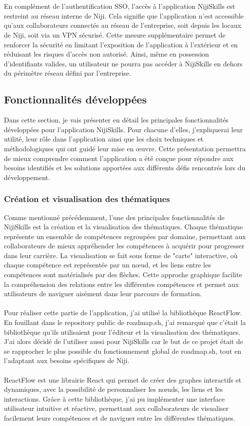 \documentclass[12pt]{article}
\begin{document}
\\\\
En complément de l’authentification SSO, l’accès à l’application NijiSkills est restreint au réseau interne de Niji. Cela signifie que l’application n’est accessible qu’aux collaborateurs connectés au réseau de l’entreprise, soit depuis les locaux de Niji, soit via un VPN sécurisé. Cette mesure supplémentaire permet de renforcer la sécurité en limitant l’exposition de l’application à l’extérieur et en réduisant les risques d’accès non autorisé. Ainsi, même en possession d’identifiants valides, un utilisateur ne pourra pas accéder à NijiSkills en dehors du périmètre réseau défini par l’entreprise.
\subsection{Fonctionnalités développées}
Dans cette section, je vais présenter en détail les principales fonctionnalités développées pour l’application NijiSkills. Pour chacune d’elles, j’expliquerai leur utilité, leur rôle dans l’application ainsi que les choix techniques et méthodologiques qui ont guidé leur mise en œuvre. Cette présentation permettra de mieux comprendre comment l’application a été conçue pour répondre aux besoins identifiés et les solutions apportées aux différents défis rencontrés lors du développement.
\subsubsection{Création et visualisation des thématiques}
Comme mentionné précédemment, l'une des principales fonctionnalités de NijiSkills est la création et la visualisation des thématiques. Chaque thématique représente un ensemble de compétences regroupées par domaine, permettant aux collaborateurs de mieux appréhender les compétences à acquérir pour progresser dans leur carrière. La visualisation se fait sous forme de "carte" interactive, où chaque compétence est représentée par un nœud, et les liens entre les compétences sont matérialisés par des flèches. Cette approche graphique facilite la compréhension des relations entre les différentes compétences et permet aux utilisateurs de naviguer aisément dans leur parcours de formation.
\\\\
Pour réaliser cette partie de l'application, j'ai utilisé la bibliothèque ReactFlow. En fouillant dans le repository public de roadmap.sh, j'ai remarqué que c'était la bibliothèque qu'ils utilisaient pour l'éditeur et la visualisation des thématiques. J'ai alors décidé de l'utiliser aussi pour NijiSkills car le but de ce projet était de se rapprocher le plus possible du fonctionnement global de roadmap.sh, tout en l'adaptant aux besoins spécifiques de Niji.
\\\\
ReactFlow est une librairie React qui permet de créer des graphes interactifs et dynamiques, avec la possibilité de personnaliser les nœuds, les liens et les interactions. Grâce à cette bibliothèque, j'ai pu implémenter une interface utilisateur intuitive et réactive, permettant aux collaborateurs de visualiser facilement leurs compétences et de naviguer entre les différentes thématiques.
\end{document}
